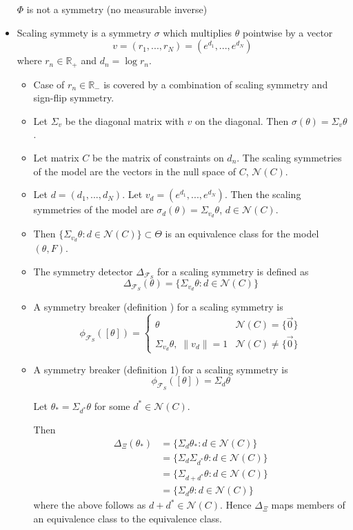 \documentclass{article}
\begin{document}
\begin{itemize}
$\Phi$ is not a symmetry (no measurable inverse)

\item
Scaling symmety is a symmetry $\sigma$ which multiplies $\theta$ pointwise by a vector
\[
v=(r_1,...,r_N) = (e^{d_1},...,e^{d_N})
\]
where $r_n\in \mathbb{R}_+$ and $d_n=\log r_n$.

\begin{itemize}

\item
Case of $r_n\in\mathbb{R}_-$ is covered by a combination of scaling symmetry and sign-flip symmetry.

\item
Let $\Sigma_v$ be the diagonal matrix with $v$ on the diagonal. Then $\sigma(\theta)=\Sigma_v\theta$.

\item
Let matrix $C$ be the matrix of constraints on $d_n$. The scaling symmetries of the model are the vectors in the null space of $C$, $\mathcal{N}(C)$.

\item
Let $d=(d_1,...,d_N)$. Let $v_d = (e^{d_1},...,e^{d_N})$. Then the scaling symmetries of the model are $\sigma_{d}(\theta)=\Sigma_{v_d}\theta$, $d\in\mathcal{N}(C)$.

\item
Then $\{\Sigma_{v_d}\theta:d\in\mathcal{N}(C)\}\subset\Theta$ is an equivalence class for the model $(\theta,F)$.

\item
The symmetry detector $\Delta_{\mathcal{F}_S}$ for a scaling symmetry is defined as
\[
\Delta_{\mathcal{F}_S}(\theta) = \{\Sigma_{v_d}\theta: d\in\mathcal{N}(C)\}
\]

\item A symmetry breaker (definition ) for a scaling symmetry is
\[
\phi_{\mathcal{F}_S}([\theta]) =
\begin{cases}
\theta & \mathcal{N}(C) = \{\vec{0}\} \\
\Sigma_{v_d}\theta, \; \|v_d\|=1 & \mathcal{N}(C) \neq \{\vec{0}\}
\end{cases}
\]

\item
A symmetry breaker (definition 1) for a scaling symmetry is
\[
\phi_{\mathcal{F}_S}([\theta]) = \Sigma_d\theta
\]

Let $\theta_* = \Sigma_{d^*}\theta$ for some $d^*\in\mathcal{N}(C)$.

Then
\begin{align*}
\Delta_\Xi(\theta_*) &= \{\Sigma_d\theta_*:d\in\mathcal{N}(C)\} \\
&= \{\Sigma_d\Sigma_{d^*}\theta:d\in\mathcal{N}(C)\} \\
&= \{\Sigma_{d+d^*}\theta:d\in\mathcal{N}(C)\} \\
&= \{\Sigma_d\theta:d\in\mathcal{N}(C)\}
\end{align*}
where the above follows as $d+d^*\in\mathcal{N}(C)$. Hence $\Delta_\Xi$ maps members of an equivalence class to the equivalence class.


\end{itemize}
\end{itemize}
\end{document}
